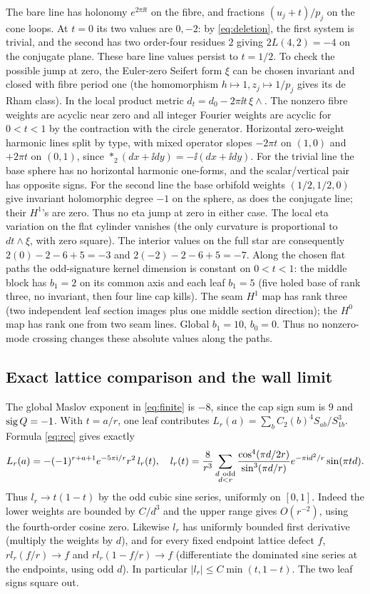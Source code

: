 The bare line has holonomy \(e^{2\pi\ii t}\) on the fibre, and fractions \((u_j+t)/p_j\) on the cone loops. At \(t=0\) its two values are \(0,-2\): by \eqref{eq:deletion}, the first system is trivial, and the second has two order-four residues \(2\) giving \(2L(4,2)=-4\) on the conjugate plane. These bare line values persist to \(t=1/2\). To check the possible jump at zero, the Euler-zero Seifert form \(\xi\) can be chosen invariant and closed with fibre period one (the homomorphism \(h\mapsto1,z_j\mapsto1/p_j\) gives its de Rham class). In the local product metric \(d_t=d_0-2\pi\ii t\,\xi\wedge\). The nonzero fibre weights are acyclic near zero and all integer Fourier weights are acyclic for \(0<t<1\) by the contraction with the circle generator. Horizontal zero-weight harmonic lines split by type, with mixed operator slopes \(-2\pi t\) on \((1,0)\) and \(+2\pi t\) on \((0,1)\), since \(*_2(dx+\ii dy)=-\ii(dx+\ii dy)\). For the trivial line the base sphere has no horizontal harmonic one-forms, and the scalar/vertical pair has opposite signs. For the second line the base orbifold weights \((1/2,1/2,0)\) give invariant holomorphic degree \(-1\) on the sphere, as does the conjugate line; their \(H^1\)'s are zero. Thus no eta jump at zero in either case. The local eta variation on the flat cylinder vanishes (the only curvature is proportional to \(dt\wedge\xi\), with zero square). The interior values on the full star are consequently \(2(0)-2-6+5=-3\) and \(2(-2)-2-6+5=-7\). Along the chosen flat paths the odd-signature kernel dimension is constant on \(0<t<1\): the middle block has \(b_1=2\) on its common axis and each leaf \(b_1=5\) (five holed base of rank three, no invariant, then four line cap kills). The seam \(H^1\) map has rank three (two independent leaf section images plus one middle section direction); the \(H^0\) map has rank one from two seam lines. Global \(b_1=10\), \(b_0=0\). Thus no nonzero-mode crossing changes these absolute values along the paths.

\subsection{Exact lattice comparison and the wall limit}

The global Maslov exponent in \eqref{eq:finite} is \(-8\), since the cap sign sum is \(9\) and \(\operatorname{sig} Q=-1\). With \(t=a/r\), one leaf contributes \(L_r(a)=\sum_b C_2(b)^4 S_{ab}/S_{1b}^3\). Formula \eqref{eq:rec} gives exactly
\[
 L_r(a)=-(-1)^{r+a+1}e^{-5\pi\mathrm i/r}r^2\,l_r(t),\quad
 l_r(t)=\frac8{r^3}\sum_{\substack{d\ {\rm odd}\\d<r}}
 \frac{\cos^4(\pi d/2r)}{\sin^3(\pi d/r)}
 e^{-\pi\mathrm i d^2/r}\sin(\pi td).
\]
Thus \(l_r\to t(1-t)\) by the odd cubic sine series, uniformly on \([0,1]\). Indeed the lower weights are bounded by \(C/d^3\) and the upper range gives \(O(r^{-2})\), using the fourth-order cosine zero. Likewise \(l_r\) has uniformly bounded first derivative (multiply the weights by \(d\)), and for every fixed endpoint lattice defect \(f\), \(r l_r(f/r)\to f\) and \(r l_r(1-f/r)\to f\) (differentiate the dominated sine series at the endpoints, using odd \(d\)). In particular \(|l_r|\le C\min(t,1-t)\). The two leaf signs square out.

